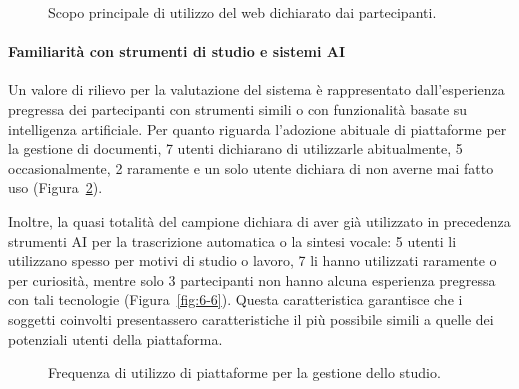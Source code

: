 \begin{figure}[H]
	\centering
	\caption{Scopo principale di utilizzo del web dichiarato dai partecipanti.}
	\label{fig:6-4}
\end{figure}

\paragraph{Familiarità con strumenti di studio e sistemi AI}
Un valore di rilievo per la valutazione del sistema è rappresentato dall'esperienza pregressa dei partecipanti con strumenti simili o con funzionalità basate su intelligenza artificiale. Per quanto riguarda l'adozione abituale di piattaforme per la gestione di documenti, 7 utenti dichiarano di utilizzarle abitualmente, 5 occasionalmente, 2 raramente e un solo utente dichiara di non averne mai fatto uso (Figura~\ref{fig:6-5}).

Inoltre, la quasi totalità del campione dichiara di aver già utilizzato in precedenza strumenti AI per la trascrizione automatica o la sintesi vocale: 5 utenti li utilizzano spesso per motivi di studio o lavoro, 7 li hanno utilizzati raramente o per curiosità, mentre solo 3 partecipanti non hanno alcuna esperienza pregressa con tali tecnologie (Figura~\ref{fig:6-6}). Questa caratteristica garantisce che i soggetti coinvolti presentassero caratteristiche il più possibile simili a quelle dei potenziali utenti della piattaforma.

\begin{figure}[H]
	\centering
	\caption{Frequenza di utilizzo di piattaforme per la gestione dello studio.}
	\label{fig:6-5}
\end{figure}


